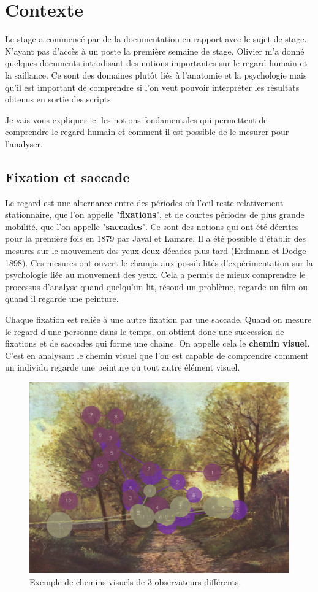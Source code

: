 \chapter{Contexte}
\par
Le stage a commencé par de la documentation en rapport avec le sujet de stage. N'ayant pas d'accès à un poste la première semaine de stage, Olivier m'a donné quelques documents introdisant des notions importantes sur le regard humain et la saillance. Ce sont des domaines plutôt liés à l'anatomie et la psychologie mais qu'il est important de comprendre si l'on veut pouvoir interpréter les résultats obtenus en sortie des scripts.
\par
Je vais vous expliquer ici les notions fondamentales qui permettent de comprendre le regard humain et comment il est possible de le mesurer pour l'analyser.

\section{Fixation et saccade}
\par
Le regard est une alternance entre des périodes où l'\oe{}il reste relativement stationnaire, que l'on appelle "\textbf{fixations}", et de courtes périodes de plus grande mobilité, que l'on appelle "\textbf{saccades}"\cite{gaze}. Ce sont des notions qui ont été décrites pour la première fois en 1879 par Javal et Lamare. Il a été possible d'établir des mesures sur le mouvement des yeux deux décades plus tard (Erdmann et Dodge 1898). Ces mesures ont ouvert le champs aux possibilités d'expérimentation sur la psychologie liée au mouvement des yeux. Cela a permis de mieux comprendre le processus d'analyse quand quelqu'un lit, résoud un problème, regarde un film ou quand il regarde une peinture.

\par
Chaque fixation est reliée à une autre fixation par une saccade. Quand on mesure le regard d'une personne dans le temps, on obtient donc une succession de fixations et de saccades qui forme une chaine. On appelle cela le \textbf{chemin visuel}. C'est en analysant le chemin visuel que l'on est capable de comprendre comment un individu regarde une peinture ou tout autre élément visuel.

\begin{figure}[!ht]
    \centering
    \includegraphics[width=0.7\linewidth]{datas/exemple_scanpaths2.png}
    \caption{Exemple de chemins visuels de 3 observateurs différents.}
    \label{ex_scanpath}
\end{figure}

